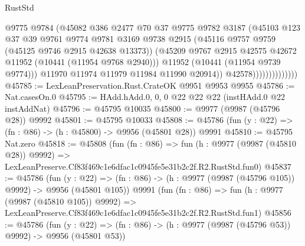 \begin{lexlean}{RustStd}
\begin{coremodule}
                                  @9775
                                  @9784
                                  (@45082
                                    @386
                                    @2477
                                    @70
                                    @37
                                    @9775
                                    @9782
                                    @3187
                                    (@45103
                                      @123
                                      @37
                                      @39
                                      @9761
                                      @9774
                                      @9781
                                      @3169
                                      @9738
                                      @2915
                                      (@45116 @9757 @9759 (@45125 @9746 @2915 @42638 @13373))
                                      (@45209
                                        @9767
                                        @2915
                                        @42575
                                        @42672
                                        @11952
                                        (@10441 (@11954 @9768 @2940)))
                                      @11952
                                      (@10441 (@11954 @9739 @9774)))
                                    @11970
                                    @11974
                                    @11979
                                    @11984
                                    @11990
                                    @20914))
                                @42578))))))))))))))
@45785 := LexLeanPreservation.Rust.CrateOK @9951 @9953 @9955
@45786 := Nat.casesOn.{0}
@45795 := HAdd.hAdd.{0, 0, 0} @22 @22 @22 (instHAdd.{0} @22 instAddNat)
@45796 := @45795 @10035
@45800 := @9977 (@9987 (@45796 @28)) @9992
@45801 := @45795 @10033
@45808 := @45786 (fun (y : @22) => (fn : @86) -> (h : @45800) -> @9956 (@45801 @28)) @9991
@45810 := @45795 Nat.zero
@45818 := @45808
    (fun (fn : @86) =>
    fun (h : @9977 (@9987 (@45810 @28)) @9992) =>
    LexLeanPreserve.Cf83f469c1e6dfac1c0945fe5e31b2c2f.R2.RustStd.fun0)
@45837 := @45786
    (fun (y : @22) => (fn : @86) -> (h : @9977 (@9987 (@45796 @105)) @9992) -> @9956 (@45801 @105))
    @9991
    (fun (fn : @86) =>
    fun (h : @9977 (@9987 (@45810 @105)) @9992) =>
    LexLeanPreserve.Cf83f469c1e6dfac1c0945fe5e31b2c2f.R2.RustStd.fun1)
@45856 := @45786
    (fun (y : @22) => (fn : @86) -> (h : @9977 (@9987 (@45796 @53)) @9992) -> @9956 (@45801 @53))

\end{coremodule}
\end{lexlean}
